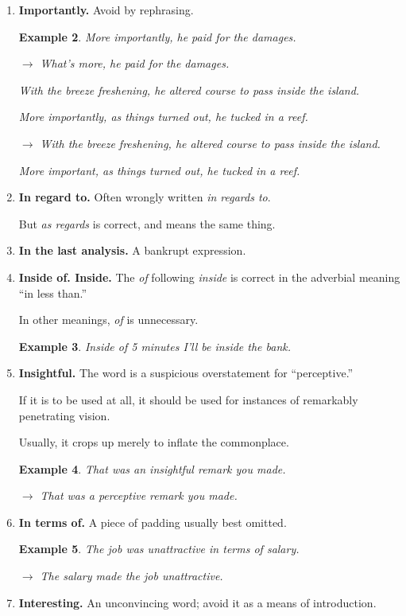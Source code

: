 \documentclass{article}
\newtheorem{example}{Example}
\begin{document}
\begin{enumerate}
\begin{example}
		Since she was a a farmer, we inferred that she got up early.
	\end{example}
	\item {\bf Importantly.} Avoid by rephrasing.
	\begin{example}
		More importantly, he paid for the damages.
		
		$\to$ What's more, he paid for the damages.
		
		With the breeze freshening, he altered course to pass inside the island.
		
		More importantly, as things turned out, he tucked in a reef.
		
		$\to$ With the breeze freshening, he altered course to pass inside the island.
		
		More important, as things turned out, he tucked in a reef.
	\end{example}
	\item {\bf In regard to.} Often wrongly written {\it in regards to}.
	
	But {\it as regards} is correct, and means the same thing.
	\item {\bf In the last analysis.} A bankrupt expression.
	\item {\bf Inside of. Inside.} The {\it of} following {\it inside} is correct in the adverbial meaning ``in less than.''
	
	In other meanings, {\it of} is unnecessary.
	\begin{example}
		Inside of 5 minutes I'll be inside the bank.
	\end{example}
	\item {\bf Insightful.} The word is a suspicious overstatement for ``perceptive.''
	
	If it is to be used at all, it should be used for instances of remarkably penetrating vision.
	
	Usually, it crops up merely to inflate the commonplace.
	\begin{example}
		That was an insightful remark you made.
		
		$\to$ That was a perceptive remark you made.
	\end{example}
	\item {\bf In terms of.} A piece of padding usually best omitted.
	\begin{example}
		The job was unattractive in terms of salary.
		
		$\to$ The salary made the job unattractive.
	\end{example}
	\item {\bf Interesting.} An unconvincing word; avoid it as a means of introduction.
	

\end{enumerate}
\end{document}
